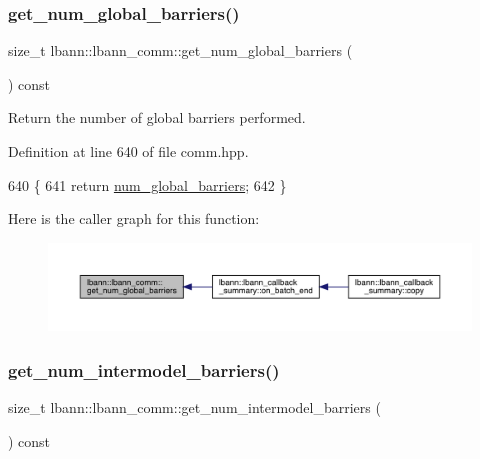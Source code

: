 \subsubsection{\texorpdfstring{get\+\_\+num\+\_\+global\+\_\+barriers()}{get\_num\_global\_barriers()}}
{\footnotesize\ttfamily size\+\_\+t lbann\+::lbann\+\_\+comm\+::get\+\_\+num\+\_\+global\+\_\+barriers (\begin{DoxyParamCaption}{ }\end{DoxyParamCaption}) const\hspace{0.3cm}{\ttfamily [inline]}}

Return the number of global barriers performed. 

Definition at line 640 of file comm.\+hpp.


\begin{DoxyCode}
640                                                 \{
641     \textcolor{keywordflow}{return} \hyperlink{classlbann_1_1lbann__comm_a4f01e2f2d8220dc34cf39eb4a255cd7d}{num\_global\_barriers};
642   \}
\end{DoxyCode}
Here is the caller graph for this function\+:\nopagebreak
\begin{figure}[H]
\begin{center}
\leavevmode
\includegraphics[width=350pt]{classlbann_1_1lbann__comm_ad5a4f05dc5a2c992ebb659650a7dc6ce_icgraph}
\end{center}
\end{figure}
\mbox{\label{classlbann_1_1lbann__comm_a78ea2f289eb8de66edecb84b6cf48b84}} 
\subsubsection{\texorpdfstring{get\+\_\+num\+\_\+intermodel\+\_\+barriers()}{get\_num\_intermodel\_barriers()}}
{\footnotesize\ttfamily size\+\_\+t lbann\+::lbann\+\_\+comm\+::get\+\_\+num\+\_\+intermodel\+\_\+barriers (\begin{DoxyParamCaption}{ }\end{DoxyParamCaption}) const\hspace{0.3cm}{\ttfamily [inline]}}

